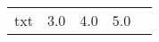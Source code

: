 \begin{table}[h!tbc]
{
\centering
\caption{}
\label{tab:}
\small
\begin{tabular}{l l l r r}
\toprule
\midrule
      txt & \num{ 3.0} & \num{ 4.0} & \num{ 5.0}

\bottomrule
\end{tabular}

} %
\end{table}
